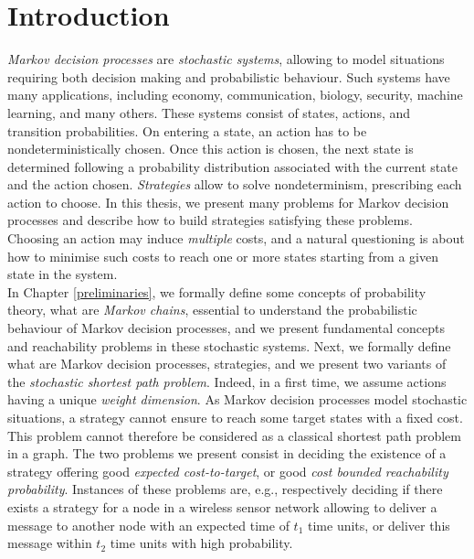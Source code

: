 \chapter*{Introduction}

\textit{Markov decision processes} are \textit{stochastic systems}, allowing to model situations requiring both decision making and probabilistic behaviour.
Such systems have many applications, including economy, communication, biology, security, machine learning, and many others.
These systems consist of states, actions, and transition probabilities.
On entering a state, an action has to be nondeterministically chosen.
Once this action is chosen, the next state is determined following a probability distribution associated with the current state and the action chosen.
\textit{Strategies} allow to solve nondeterminism, prescribing each action to choose.
In this thesis, we present many problems for Markov decision processes and describe how to build strategies satisfying these problems.
Choosing an action may induce \textit{multiple} costs, and a natural questioning is about how to minimise such costs to reach one or more states starting from a given state in the system. \\

In Chapter \ref{preliminaries}, we formally define some concepts of probability theory, what are \textit{Markov chains}, essential to understand the probabilistic behaviour of Markov decision processes, and we present fundamental concepts and reachability problems in these stochastic systems.
Next, we formally define what are Markov decision processes, strategies, and we present
 two variants of the \textit{stochastic shortest path problem}.
 Indeed, in a first time, we assume actions having a unique \textit{weight dimension}.
As Markov decision processes model stochastic situations, a strategy cannot ensure to reach some target states with a fixed cost.
This problem cannot therefore be considered as a classical shortest path problem in a graph.
The two problems we present consist in deciding the existence of a strategy offering good \textit{expected cost-to-target}, or good \textit{cost bounded reachability probability}.
Instances of these problems are, e.g., respectively deciding if there exists a strategy for a node in a wireless sensor network allowing to deliver a message to another node with an expected time of $t_1$ time units, or deliver this message within $t_2$ time units with high probability.\\

